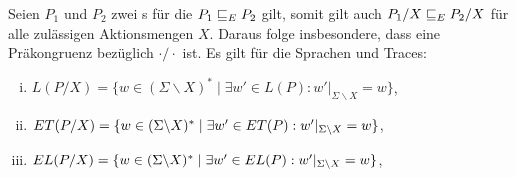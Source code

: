 \begin{Satz}
  \label{FehlerHidingSatz}
  Seien $P_1$ und $P_2$ zwei \MEIO{}s für die $P_1 \sqsubseteq  _E P_2$ gilt, somit gilt
  auch $P_1/X \sqsubseteq  _E P_2/X$ für alle zulässigen Aktionsmengen $X$. Daraus folge
  insbesondere, dass \ERel{} eine Präkongruenz bezüglich $\cdot /\cdot$ ist. Es
  gilt für die Sprachen und Traces:
  \begin{enumerate}[(i)]
    \item $L(P/X) = \{w\in (\Sigma\backslash X)^*\mid \exists w'\in L(P):
      w'|_{\Sigma\backslash X} = w\}$,
    \item $ET (P/X) = \{w\in (\Sigma\backslash X)^*\mid \exists w'\in ET(P):
      w'|_{\Sigma\backslash X} = w\}$,
    \item $EL (P/X) = \{w\in (\Sigma\backslash X)^*\mid \exists w'\in EL(P):
      w'|_{\Sigma\backslash X} = w\}$,
  \end{enumerate}
\end{Satz}
